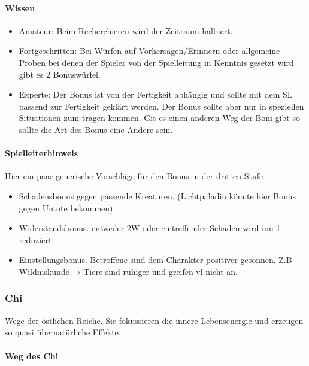 \documentclass{article}
\begin{document}
\paragraph{Wissen}

\begin{itemize}
\item Amateur: Beim Recherchieren wird der Zeitraum halbiert.
\item Fortgeschritten: Bei Würfen auf Vorhersagen/Erinnern oder allgemeine Proben bei denen der Spieler von der Spielleitung in Kenntnis gesetzt wird gibt es 2 Bonuswürfel.
\item Experte: Der Bonus ist von der Fertigkeit abhängig und sollte mit dem SL passend zur Fertigkeit geklärt werden. Der Bonus sollte aber nur in speziellen Situationen zum tragen kommen. Git es einen anderen Weg der Boni gibt so sollte die Art des Bonus eine Andere sein.
\end{itemize}

\begin{mdframed}[hidealllines=true, backgroundcolor=black!10]
\paragraph{Spielleiterhinweis}

Hier ein paar generische Vorschläge für den Bonus in der dritten Stufe

\begin{itemize}
\item Schadensbonus gegen passende Kreaturen. (Lichtpaladin könnte hier Bonus gegen Untote bekommen)
\item Widerstandsbonus. entweder 2W oder eintreffender Schaden wird um 1 reduziert.
\item Einstellungsbonus. Betroffene sind dem Charakter positiver gesonnen. Z.B Wildniskunde → Tiere sind ruhiger und greifen vl nicht an.
\end{itemize}

\end{mdframed}
\subsubsection{Chi}

Wege der östlichen Reiche. Sie fokussieren die innere Lebensenergie und erzeugen so quasi übernatürliche Effekte.

\paragraph{Weg des Chi}
\end{document}
